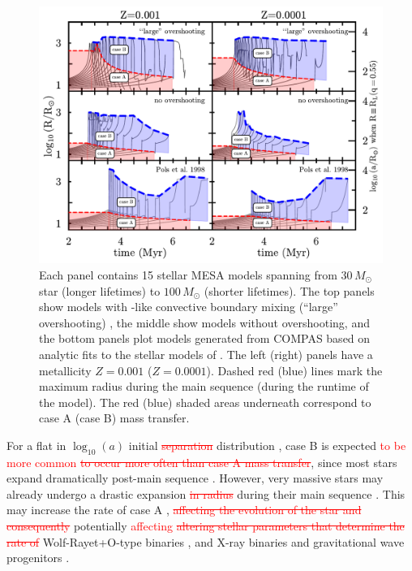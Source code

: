 \documentclass[twocolumn]{aastex63}
\newcommand{\cut}[1]{\textcolor{red}{\sout{#1}}}
\begin{document}
\begin{figure}[htbp]
  \centering
  \includegraphics[width=1.0\textwidth]{radii}
  \caption{Each panel contains 15 stellar \textsc{MESA} models spanning
    from $30 \, M_{\odot}$ star (longer lifetimes) to
    $100 \, M_{\odot}$ (shorter lifetimes). The top panels show models
    with \cite{brott:11}-like convective boundary mixing (``large''
    overshooting) \citep{claret:18}, the middle show models without
    overshooting, and the bottom panels plot models generated from
    \textsc{COMPAS} based on analytic fits to the stellar models of
    \cite{pols:98}. The left (right) panels have a metallicity
    $Z=0.001$ ($Z=0.0001$). Dashed red (blue) lines mark the maximum
    radius during the main sequence (during the runtime of the
    model). The red (blue) shaded areas underneath correspond to case
    A (case B) mass transfer.}
  \label{fig:radii}
\end{figure}


For a flat in $\log_{10}(a)$ initial \cut{separation} distribution
\citep{opik:24}, case B is expected \textcolor{red}{to be more common}
\cut{to occur more often than case A mass transfer}, since most stars
expand dramatically post-main sequence
\citep[e.g.,][]{vandenheuvel:69}. However, very massive stars may
already undergo a drastic expansion \cut{in radius} during their main
sequence \citep[e.g.,][]{sanyal:15, jiang:15}. This may increase the
rate of case A \citep{demink:08}, \cut{affecting the evolution of the
  star and consequently} potentially \textcolor{red}{affecting}
\cut{altering stellar parameters that determine the rate of}
Wolf-Rayet+O-type binaries \citep[e.g.,][]{nuijten:24}, and X-ray
binaries and gravitational wave progenitors
\citep[e.g.,][]{mandel:22}.
\end{document}

